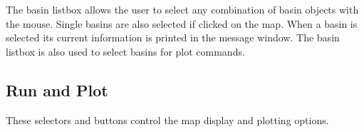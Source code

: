\begin{minipage}[t]{0.3\textwidth}
  \centering{}
\end{minipage}\hfill
\begin{minipage}[t]{0.65\textwidth}
The basin listbox allows the user to select any combination of basin objects with the mouse.  Single basins are also selected if clicked on the map.  When a basin is selected its current information is printed in the message window.  The basin listbox is also used to select basins for plot commands. 
\end{minipage}

\subsection{Run and Plot}
\label{sec:Run and Plot}
These selectors and buttons control the map display and plotting options.

